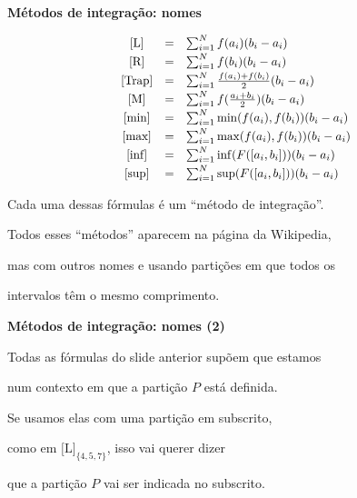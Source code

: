 \documentclass[oneside,12pt]{article}
\begin{document}

{\bf Métodos de integração: nomes}

\def\sumiN#1{\sum_{i=1}^N #1 (b_i-a_i)}
\def\mname#1{\text{[#1]}}
%
$$\scalebox{0.95}{$
  \begin{array}{ccl}
  \mname{L}    &=& \sumiN {f(a_i)}                    \\[2pt]
  \mname{R}    &=& \sumiN {f(b_i)}                    \\[2pt]
  \mname{Trap} &=& \sumiN {\frac{f(a_i) + f(b_i)}{2}} \\[2pt]
  \mname{M}    &=& \sumiN {f(\frac{a_i+b_i}{2})}      \\[2pt]
  \mname{min}  &=& \sumiN {\min(f(a_i), f(b_i))}      \\[2pt]
  \mname{max}  &=& \sumiN {\max(f(a_i), f(b_i))}      \\[2pt]
  \mname{inf}  &=& \sumiN {\inf(F([a_i,b_i]))}        \\[2pt]
  \mname{sup}  &=& \sumiN {\sup(F([a_i,b_i]))}        \\
  \end{array}
  $}
$$

Cada uma dessas fórmulas é um ``método de integração''.

Todos esses ``métodos'' aparecem na página da Wikipedia,

mas com outros nomes e usando partições em que todos os

intervalos têm o mesmo comprimento.

\newpage


{\bf Métodos de integração: nomes (2)}

\ssk

Todas as fórmulas do slide anterior supõem que estamos

num contexto em que a partição $P$ está definida.

Se usamos elas com uma partição em subscrito,

como em $\mname{L}_{\{4,5,7\}}$, isso vai querer dizer

que a partição $P$ vai ser indicada no subscrito.
\end{document}
